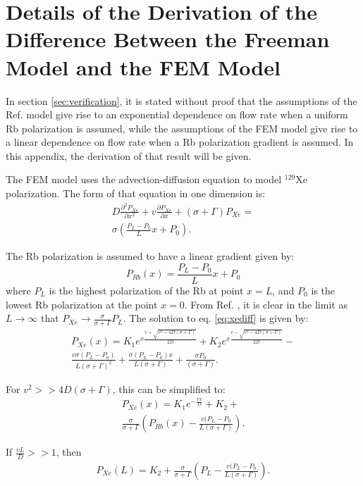 \section{Details of the Derivation of the Difference Between the Freeman Model and the FEM Model\label{sec:diffderiv}}
In section \ref{sec:verification}, it is stated without proof that the assumptions of the Ref. \cite{Freeman2014} model give rise to an exponential dependence on flow rate when a uniform Rb polarization is assumed, while the assumptions of the FEM model give rise to a linear dependence on flow rate when a Rb polarization gradient is assumed. In this appendix, the derivation of that result will be given.

The FEM model uses the advection-diffusion equation to model $^{129}$Xe polarization. The form of that equation in one dimension is:
\begin{multline}
    D\frac{\partial^2 P_{Xe}}{\partial x^2}+v\frac{\partial P_{Xe}}{\partial x}+\left(\sigma+\Gamma\right)P_{Xe}=\\ \sigma\left(\frac{P_L-P_0}{L}x+P_0\right).
    \label{eq:xediff}
\end{multline}

The Rb polarization is assumed to have a linear gradient given by:
\begin{equation}
   P_{Rb}(x)=\frac{P_L-P_0}{L}x+P_0
   \label{eq:linrbdef}
\end{equation}
where $P_L$ is the highest polarization of the Rb at point $x=L$, and $P_0$ is the lowest Rb polarization at the point $x=0$. From Ref. \cite{Walker2011}, it is clear in the limit as $L \to \infty$ that $P_{Xe} \to \frac{\sigma}{\sigma+\Gamma}P_L$. The solution to eq. \ref{eq:xediff} is given by:
\begin{multline}
     P_{Xe}(x) =  K_1e^{x\frac{v+\sqrt{v^2-4D(\sigma+\Gamma)}}{2D}}+K_2e^{x\frac{v-\sqrt{v^2-4D(\sigma+\Gamma)}}{2D}} -\\ \frac{v \sigma (P_L-P_0)}{L(\sigma+\Gamma)^2}+\frac{\sigma(P_L-P_0)x}{L(\sigma+\Gamma)}+\frac{\sigma P_0}{(\sigma+\Gamma)}.   
\end{multline}

For $v^2>>4D(\sigma+\Gamma)$, this can be simplified to:
\begin{multline}
         P_{Xe}(x) =  K_1e^{-\frac{vx}{D}}+K_2+\\ \frac{\sigma}{\sigma+\Gamma}\left(P_{Rb}(x)-\frac{v(P_L-P_0}{L(\sigma+\Gamma)}\right).
\end{multline}

If $\frac{vL}{D}>>1$, then 
\begin{multline}
    P_{Xe}(L) = K_2+\frac{\sigma}{\sigma+\Gamma}\left(P_L-\frac{v(P_L-P_0}{L(\sigma+\Gamma)}\right).
\end{multline}

